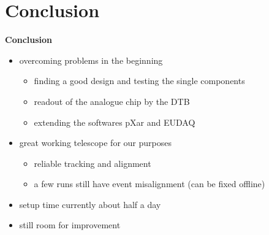 \documentclass[9pt]{beamer}
\begin{document}
\section{Conclusion}
\begin{frame}
	\begin{alertblock}{
		\begin{center}
			\Large{\textbf{Conclusion}}
		\end{center}}
	\end{alertblock}
\end{frame}
\begin{frame}
	\begin{itemize}
		\setlength{\itemsep}{\fill}
		\item overcoming problems in the beginning
		\begin{itemize}
			\item finding a good design and testing the single components
			\item readout of the analogue chip by the DTB 
			\item extending the softwares pXar and EUDAQ
		\end{itemize}
		\item great working telescope for our purposes
		\begin{itemize}
			\item reliable tracking and alignment
			\item a few runs still have event misalignment (can be fixed offline)
		\end{itemize}
		\item setup time currently about half a day
		\item still room for improvement
	\end{itemize}
\end{frame}
\end{document}
